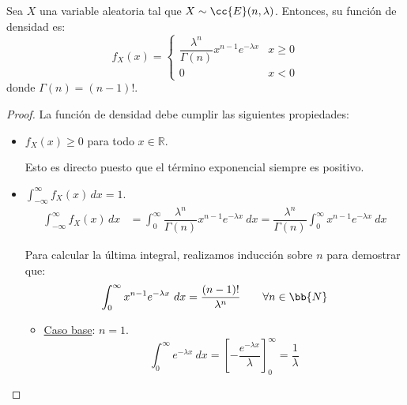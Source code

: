 \begin{prop}
    Sea $X$ una variable aleatoria tal que $X\sim \cc{E}(n,\lambda)$. Entonces, su función de densidad es:
    \begin{equation*}
        f_X(x) = \begin{cases}
            \dfrac{\lambda^n}{\Gamma(n)}x^{n-1}e^{-\lambda x} & x\geq 0\\
            0 & x<0
        \end{cases}
    \end{equation*}
    donde $\Gamma(n) = (n-1)!$.
\end{prop}
\begin{proof}
    La función de densidad debe cumplir las siguientes propiedades:
    \begin{itemize}
        \item $f_X(x)\geq 0$ para todo $x\in \mathbb{R}$.
        
        Esto es directo puesto que el término exponencial siempre es positivo.
        
        \item $\displaystyle \int_{-\infty}^{\infty} f_X(x) \, dx = 1$.
        \begin{align*}
            \int_{-\infty}^{\infty} f_X(x) \, dx &= \int_{0}^{\infty} \dfrac{\lambda^n}{\Gamma(n)}x^{n-1}e^{-\lambda x}~dx
            = \dfrac{\lambda^n}{\Gamma(n)} \int_{0}^{\infty} x^{n-1}e^{-\lambda x}~dx
        \end{align*}

        Para calcular la última integral, realizamos inducción sobre $n$ para demostrar que:
        \begin{equation*}
            \int_{0}^{\infty} x^{n-1}e^{-\lambda x}~dx = \dfrac{(n-1)!}{\lambda^n} \qquad
            \forall n\in \bb{N}
        \end{equation*}
        \begin{itemize}
            \item \ul{Caso base}: $n=1$.
            \begin{equation*}
                \int_{0}^{\infty} e^{-\lambda x}~dx = \left[ -\dfrac{e^{-\lambda x}}{\lambda} \right]_{0}^{\infty} = \dfrac{1}{\lambda}
            \end{equation*}


\end{itemize}
\end{itemize}
\end{proof}
